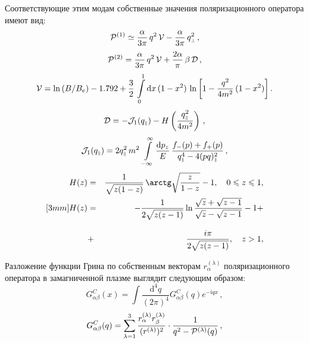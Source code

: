 \documentclass[14pt, russian]{article}
\def\mprp{\mbox{\tiny $\bot$}}
\def\mprl{\mbox{\tiny $\|$}}
\newcommand{\ii}{\mathrm{i}} %
\newcommand{\dd}{\mathrm{d}} %
\begin{document}
Соответствующие этим модам собственные значения поляризационного оператора имеют вид:
%
\begin{equation}
\label{eq:kappa10}
{\cal P}^{(1)} \simeq \frac{\alpha}{3\pi} \, q^2 \, {\cal V} - \frac{\alpha}{3\pi} \, 
q^2_{\mprp}\, ,
\end{equation}
%
\begin{equation}
\label{eq:kappa2}
{\cal P}^{(2)} = \frac{\alpha}{3\pi} \, q^2 \, {\cal V} + \frac{2 \alpha}{\pi} \, \beta \, {\cal D} \, ,
\end{equation}
%
\begin{equation}
\label{eq:Lambda}
{\cal V} = \ln{(B/B_e)} - 1.792 + \frac{3}{2} \, \int\limits_0^1 \dd x \, (1-x^2) \, 
\ln{\left [1- \frac{q^2}{4m^2} \, (1-x^2) \right ]} \, .
\end{equation}
%
\begin{equation}
\label{eq:PabD}
{\cal D} = - {\cal J}_1 (q_{\mprl})  - 
H \left (\frac{q^2_{\mprl}}{4m^2} \right)  \, , 
\end{equation}
%
\begin{equation}
\label{eq:PabJ}
{\cal J}_1 (q_{\mprl}) = 2q^2_{\mprl} \, m^2 \, \int\limits_{-\infty}^{\infty}  \frac{\dd p_z}{E} \, 
\frac{f_{-}(p) + f_{+}(p)}{q_{\mprl}^4 - 4(pq)^2_{\mprl}} \, , 
\end{equation}
%
\begin{eqnarray}
\label{eq:H0}
H(z)&=&\frac{1}{\sqrt{z(1 - z)}} \, \arctg \sqrt{\frac{z}{1 - z}} - 1,
\quad 0 \leqslant z \leqslant 1,
\\ [3mm]
\label{eq:H1}
H(z) &=& - \frac{1}{2\sqrt{z(z-1)}}
\ln  \frac{\sqrt{z} + \sqrt{z-1}}{\sqrt{z} - \sqrt{z-1}}  - 1 + 
\\[3mm]
\nonumber
&+& \frac{i\pi}{2\sqrt{z(z-1)}}, \quad z > 1, 
\end{eqnarray}

Разложение функции Грина по собственным векторам 
$r_\alpha^{(\lambda)}$ поляризационного оператора в замагниченной плазме 
выглядит следующим образом:
\begin{equation}\label{eq:InvGcFourier}
	G^C_{\alpha\beta}(x)=\int \frac{\dd^4q}{(2\pi)^4}G^C_{\alpha \beta}(q) e^{-\ii qx}\, ,
\end{equation}
\begin{equation}\label{eq:GcFourier}
	G^C_{\alpha\beta}(q)=\sum_{\lambda=1}^{3}\frac{r_\alpha^{(\lambda)}r^{(\lambda)}_\beta}{(r^{(\lambda)})^2}\cdot \frac{1}{q^2-{\cal P}^{(\lambda)}(q)}\, ,
\end{equation}
\end{document}
